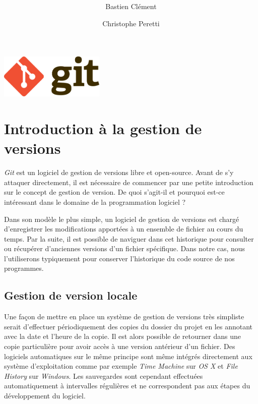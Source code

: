 \documentclass[11pt,a4paper]{article}
\author{Bastien Clément \and Christophe Peretti}
\title{{\normalsize \doccourse} \\ \doctitle }
\begin{document}

\maketitle

\vspace{4cm}
\begin{center}
\includegraphics[width=5cm]{git_logo}
\end{center}

\pagebreak

\tableofcontents

\pagebreak
{}

\section{Introduction à la gestion de versions}

\textit{Git} est un logiciel de gestion de versions libre et open-source.
Avant de s'y attaquer directement, il est nécessaire de commencer par une petite introduction sur le concept de gestion de version.
De quoi s'agit-il et pourquoi est-ce intéressant dans le domaine de la programmation logiciel ?

Dans son modèle le plus simple, un logiciel de gestion de versions est chargé d'enregistrer les modifications apportées à un ensemble de fichier au cours du temps.
Par la suite, il est possible de naviguer dans cet historique pour consulter ou récupérer d'anciennes versions d'un fichier spécifique.
Dans notre cas, nous l'utiliserons typiquement pour conserver l'historique du code source de nos programmes.

\subsection{Gestion de version locale}

Une façon de mettre en place un système de gestion de versions très simpliste serait d'effectuer périodiquement des copies du dossier du projet en les annotant avec la date et l'heure de la copie.
Il est alors possible de retourner dans une copie particulière pour avoir accès à une version antérieur d'un fichier.
Des logiciels automatiques sur le même principe sont même intégrés directement aux système d'exploitation comme par exemple \textit{Time Machine} sur \textit{OS X} et \textit{File History} sur \textit{Windows}.
Les sauvegardes sont cependant effectuées automatiquement à intervalles régulières et ne correspondent pas aux étapes du développement du logiciel.
\end{document}
